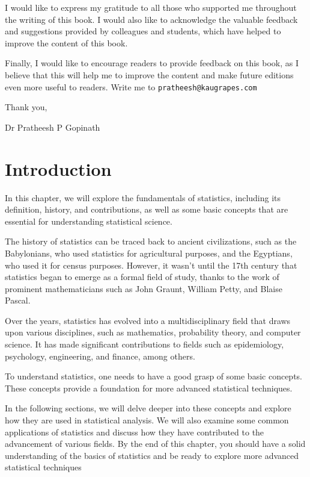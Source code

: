 \documentclass[
]{book}
\begin{document}
I would like to express my gratitude to all those who supported me throughout the writing of this book. I would also like to acknowledge the valuable feedback and suggestions provided by colleagues and students, which have helped to improve the content of this book.

Finally, I would like to encourage readers to provide feedback on this book, as I believe that this will help me to improve the content and make future editions even more useful to readers. Write me to \texttt{pratheesh@kaugrapes.com}

Thank you,

Dr Pratheesh P Gopinath

\hypertarget{introduction}{%
\chapter{Introduction}\label{introduction}}

In this chapter, we will explore the fundamentals of statistics, including its definition, history, and contributions, as well as some basic concepts that are essential for understanding statistical science.

The history of statistics can be traced back to ancient civilizations, such as the Babylonians, who used statistics for agricultural purposes, and the Egyptians, who used it for census purposes. However, it wasn't until the 17th century that statistics began to emerge as a formal field of study, thanks to the work of prominent mathematicians such as John Graunt, William Petty, and Blaise Pascal.

Over the years, statistics has evolved into a multidisciplinary field that draws upon various disciplines, such as mathematics, probability theory, and computer science. It has made significant contributions to fields such as epidemiology, psychology, engineering, and finance, among others.

To understand statistics, one needs to have a good grasp of some basic concepts. These concepts provide a foundation for more advanced statistical techniques.

In the following sections, we will delve deeper into these concepts and explore how they are used in statistical analysis. We will also examine some common applications of statistics and discuss how they have contributed to the advancement of various fields. By the end of this chapter, you should have a solid understanding of the basics of statistics and be ready to explore more advanced statistical techniques\citep{goon} \citep{gupta}
\end{document}
